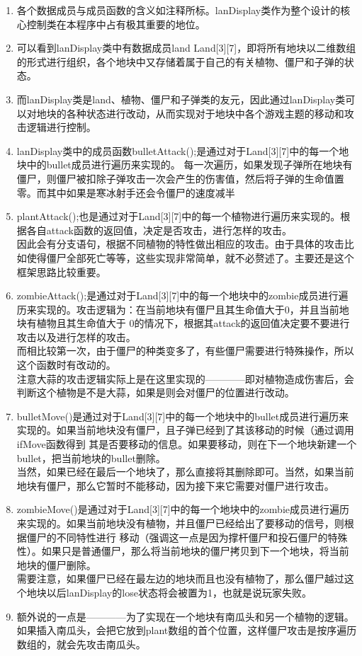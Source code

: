 \documentclass[12pt,a4paper,UTF8]{article}
\begin{document}
    \begin{enumerate}
      \item 各个数据成员与成员函数的含义如注释所标。lanDisplay类作为整个设计的核心控制类在本程序中占有极其重要的地位。
      \item 可以看到lanDisplay类中有数据成员land Land[3][7]，即将所有地块以二维数组的形式进行组织，各个地块中又存储着属于自己的有关植物、僵尸和子弹的状态。
      \item 而lanDisplay类是land、植物、僵尸和子弹类的友元，因此通过lanDisplay类可以对地块的各种状态进行改动，从而实现对于地块中各个游戏主题的移动和攻击逻辑进行控制。
      \item lanDisplay类中的成员函数bulletAttack();是通过对于Land[3][7]中的每一个地块中的bullet成员进行遍历来实现的。
      每一次遍历，如果发现子弹所在地块有僵尸，则僵尸被扣除子弹攻击一次会产生的伤害值，然后将子弹的生命值置零。而其中如果是寒冰射手还会令僵尸的速度减半
      \item plantAttack();也是通过对于Land[3][7]中的每一个植物进行遍历来实现的。根据各自attack函数的返回值，决定是否攻击，进行怎样的攻击。\\
      因此会有分支语句，根据不同植物的特性做出相应的攻击。由于具体的攻击比如使得僵尸全部死亡等等，这些实现非常简单，就不必赘述了。主要还是这个框架思路比较重要。
      \item zombieAttack();是通过对于Land[3][7]中的每一个地块中的zombie成员进行遍历来实现的。攻击逻辑为：在当前地块有僵尸且其生命值大于0，并且当前地块有植物且其生命值大于
      0的情况下，根据其attack的返回值决定要不要进行攻击以及进行怎样的攻击。\\
      而相比较第一次，由于僵尸的种类变多了，有些僵尸需要进行特殊操作，所以这个函数时有改动的。\\
      注意大蒜的攻击逻辑实际上是在这里实现的————即对植物造成伤害后，会判断这个植物是不是大蒜，如果是则会对僵尸的位置进行改动。
      \item bulletMove()是通过对于Land[3][7]中的每一个地块中的bullet成员进行遍历来实现的。如果当前地块没有僵尸，且子弹已经到了其该移动的时候（通过调用ifMove函数得到
      其是否要移动的信息。如果要移动，则在下一个地块新建一个bullet，把当前地块的bullet删除。\\
      当然，如果已经在最后一个地块了，那么直接将其删除即可。当然，如果当前地块有僵尸，那么它暂时不能移动，因为接下来它需要对僵尸进行攻击。
      \item zombieMove()是通过对于Land[3][7]中的每一个地块中的zombie成员进行遍历来实现的。如果当前地块没有植物，并且僵尸已经给出了要移动的信号，则根据僵尸的不同特性进行
      移动（强调这一点是因为撑杆僵尸和投石僵尸的特殊性）。如果只是普通僵尸，那么将当前地块的僵尸拷贝到下一个地块，将当前地块的僵尸删除。\\
      需要注意，如果僵尸已经在最左边的地块而且也没有植物了，那么僵尸越过这个地块以后lanDisplay的lose状态将会被置为1，也就是说玩家失败。
      \item 额外说的一点是————为了实现在一个地块有南瓜头和另一个植物的逻辑。如果插入南瓜头，会把它放到plant数组的首个位置，这样僵尸攻击是按序遍历数组的，就会先攻击南瓜头。
    \end{enumerate}
\end{document}

